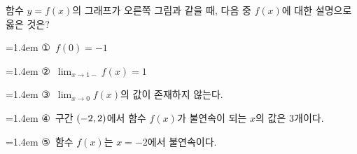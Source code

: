 \noindent\begin{minipage}[t]{0.58\linewidth}\vspace{0pt}\raggedright 함수 $y=f(x)$의 그래프가 오른쪽 그림과 같을 때, 다음 중 $f(x)$에 대한 설명으로 옳은 것은?\end{minipage}\hfill\begin{minipage}[t]{0.4\linewidth}\vspace{0pt}\centering \resizebox{\ifdim\width>\linewidth\linewidth\else\width\fi}{!}{}\end{minipage}\par
\par\medskip\par\noindent\hangindent=1.4em {\small ①}\ $f(0)=-1$\par\noindent\hangindent=1.4em {\small ②}\ $\displaystyle\lim_{x\to 1-} f(x)=1$\par\noindent\hangindent=1.4em {\small ③}\ $\displaystyle\lim_{x\to 0} f(x)$의 값이 존재하지 않는다.\par\noindent\hangindent=1.4em {\small ④}\ 구간 $(-2{,}\mkern3mu\mathopen{}2)$에서 함수 $f(x)$가 불연속이 되는 $x$의 값은 3개이다.\par\noindent\hangindent=1.4em {\small ⑤}\ 함수 $f(x)$는 $x=-2$에서 불연속이다.\par\medskip
